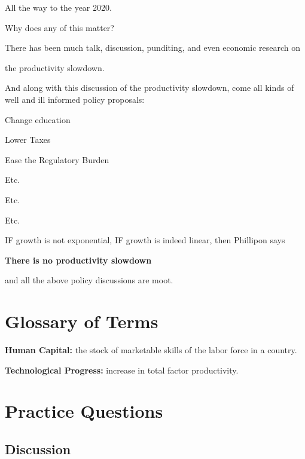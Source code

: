 \documentclass[
]{book}
\begin{document}
All the way to the year 2020.

Why does any of this matter?

There has been much talk, discussion, punditing, and even economic research on

\begin{center}
the productivity slowdown.

\end{center}

And along with this discussion of the productivity slowdown, come all kinds of well and ill informed policy proposals:

\begin{center}
Change education

Lower Taxes

Ease the Regulatory Burden

Etc.

Etc.

Etc.

\end{center}

IF growth is not exponential, IF growth is indeed linear, then Phillipon says

\begin{center}
\textbf{There is no productivity slowdown}

\end{center}

and all the above policy discussions are moot.

\hypertarget{glossary-of-terms-2}{%
\section{Glossary of Terms}\label{glossary-of-terms-2}}

\textbf{Human Capital:} the stock of marketable skills of the labor force in a country.

\textbf{Technological Progress:} increase in total factor productivity.

\hypertarget{practice-questions-2}{%
\section{Practice Questions}\label{practice-questions-2}}

\hypertarget{discussion-2}{%
\subsection{Discussion}\label{discussion-2}}
\end{document}
